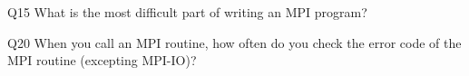 \begin{description}%
\item{Q15} What is the most difficult part of writing an MPI program?%
\item{Q20} When you call an MPI routine, how often do you check the error code of the MPI routine  (excepting MPI-IO)?%
\end{description}%
